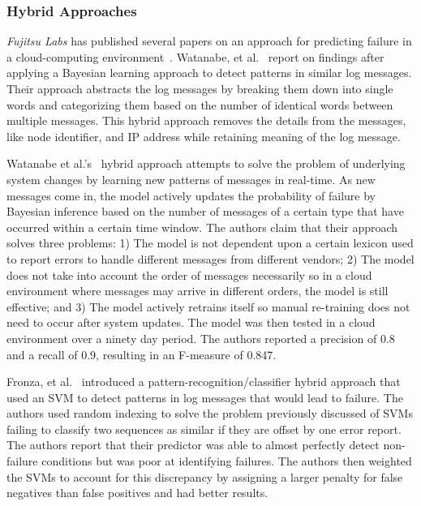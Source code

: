 \subsubsection{Hybrid Approaches}
\emph{Fujitsu Labs} has published several papers on an approach for predicting
failure in a cloud-computing
environment~\cite{sonoda2012,watanabe2012,watanabe2014}.  Watanabe, et
al.~\cite{watanabe2012, watanabe2014} report on findings after applying a
Bayesian learning approach to detect patterns in similar log messages.  Their
approach abstracts the log messages by breaking them down into single words and
categorizing them based on the number of identical words between multiple
messages.  This hybrid approach removes the details from the messages, like
node identifier, and \ac{IP} address while retaining meaning of the log
message.

Watanabe et al.'s~\cite{watanabe2014} hybrid approach attempts to solve the
problem of underlying system changes by learning new patterns of messages in
real-time.  As new messages come in, the model actively updates the probability
of failure by Bayesian inference based on the number of messages of a certain
type that have occurred within a certain time window.  The authors claim that
their approach solves three problems: 1)  The model is not dependent upon a
certain lexicon used to report errors to handle different messages from
different vendors; 2) The model does not take into account the order of
messages necessarily so in a cloud environment where messages may arrive in
different orders, the model is still effective; and 3)  The model actively
retrains itself so manual re-training does not need to occur after system
updates.  The model was then tested in a cloud environment over a ninety day
period.  The authors reported a precision of 0.8 and a recall of 0.9, resulting
in an F-measure of 0.847.  

Fronza, et al.~\cite{fronza2013} introduced a pattern-recognition/classifier
hybrid approach that used an \ac{SVM} to detect patterns in log messages that
would lead to failure.  The authors used random indexing to solve the problem
previously discussed of \ac{SVM}s failing to classify two sequences as similar
if they are offset by one error report.  The authors report that their
predictor was able to almost perfectly detect non-failure conditions but was
poor at identifying failures.  The authors then weighted the \ac{SVM}s to
account for this discrepancy by assigning a larger penalty for false negatives
than false positives and had better results.

